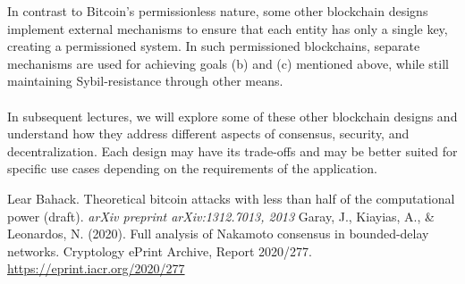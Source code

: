 \documentclass{report}
\begin{document}
In contrast to Bitcoin's permissionless nature, some other blockchain designs implement external mechanisms to ensure that each entity has only a single key, creating a permissioned system. In such permissioned blockchains, separate mechanisms are used for achieving goals (b) and (c) mentioned above, while still maintaining Sybil-resistance through other means.\\\\
In subsequent lectures, we will explore some of these other blockchain designs and understand how they address different aspects of consensus, security, and decentralization. Each design may have its trade-offs and may be better suited for specific use cases depending on the requirements of the application.

\renewcommand{\bibname}{References}
\begin{thebibliography}{9}
	 Lear Bahack. Theoretical bitcoin attacks with less than half of the computational power (draft). \textit{arXiv preprint arXiv:1312.7013, 2013}
	 Garay, J., Kiayias, A., \& Leonardos, N. (2020). Full analysis of Nakamoto consensus in bounded-delay networks. Cryptology ePrint Archive, Report 2020/277. \url{https://eprint.iacr.org/2020/277}
\end{thebibliography}
\end{document}
